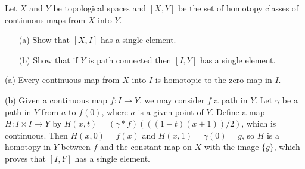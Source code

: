 \begin{prob}
    Let $X$ and $Y$ be topological spaces and $[X, Y]$ be the set of homotopy classes of continuous maps from $X$ into $Y$.
    \begin{enumerate}
        \item[(a)]
        {
            Show that $[X, I]$ has a single element.
        }
        \item[(b)]
        {
            Show that if $Y$ is path connected then $[I, Y]$ has a single element.
        }
    \end{enumerate}
\end{prob}
\begin{sol}
    \hangindent=0.65cm
    \noindent(a)
    Every continuous map from $X$ into $I$ is homotopic to the zero map in $I$.

    \noindent(b)
    Given a continuous map $f: I\rightarrow Y$, we may consider $f$ a path in $Y$.
    Let $\gamma$ be a path in $Y$ from $a$ to $f(0)$, where $a$ is a given point of $Y$.
    Define a map $H: I\times I\rightarrow Y$ by $H(x, t)=(\gamma*f)(((1-t)(x+1))/2)$, which is continuous.
    Then $H(x, 0)=f(x)$ and $H(x, 1)=\gamma(0)=g$, so $H$ is a homotopy in $Y$ between $f$ and the constant map on $X$ with the image $\{g\}$, which proves that $[I, Y]$ has a single element.
\end{sol}

